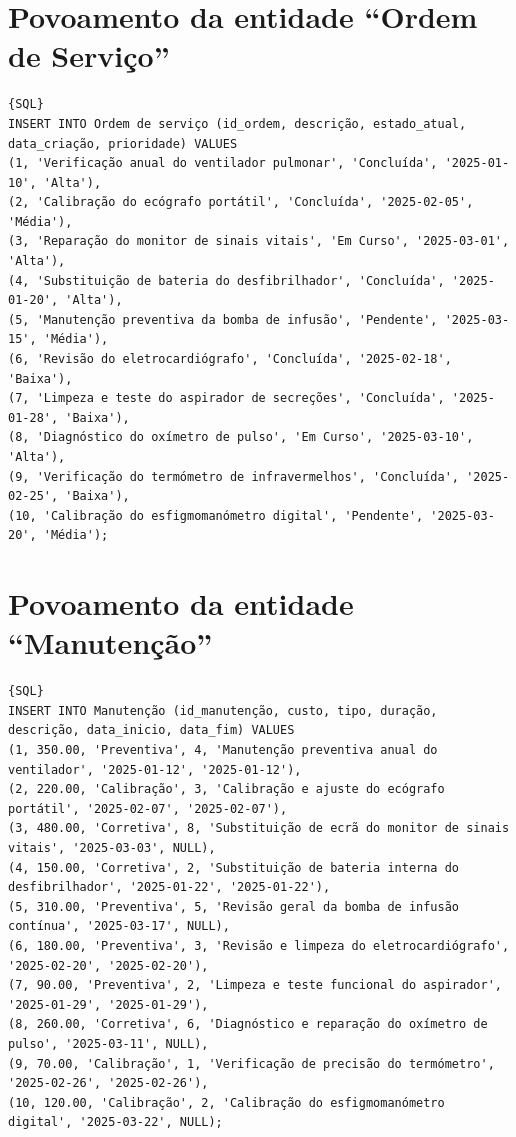 \section{Povoamento da entidade “Ordem de Serviço”}
{\small
\begin{lstlisting}[breaklines]{SQL}
INSERT INTO Ordem de serviço (id_ordem, descrição, estado_atual, data_criação, prioridade) VALUES
(1, 'Verificação anual do ventilador pulmonar', 'Concluída', '2025-01-10', 'Alta'),
(2, 'Calibração do ecógrafo portátil', 'Concluída', '2025-02-05', 'Média'),
(3, 'Reparação do monitor de sinais vitais', 'Em Curso', '2025-03-01', 'Alta'),
(4, 'Substituição de bateria do desfibrilhador', 'Concluída', '2025-01-20', 'Alta'),
(5, 'Manutenção preventiva da bomba de infusão', 'Pendente', '2025-03-15', 'Média'),
(6, 'Revisão do eletrocardiógrafo', 'Concluída', '2025-02-18', 'Baixa'),
(7, 'Limpeza e teste do aspirador de secreções', 'Concluída', '2025-01-28', 'Baixa'),
(8, 'Diagnóstico do oxímetro de pulso', 'Em Curso', '2025-03-10', 'Alta'),
(9, 'Verificação do termómetro de infravermelhos', 'Concluída', '2025-02-25', 'Baixa'),
(10, 'Calibração do esfigmomanómetro digital', 'Pendente', '2025-03-20', 'Média');
\end{lstlisting}
}

\section{Povoamento da entidade “Manutenção”}
{\small
\begin{lstlisting}[breaklines]{SQL}
INSERT INTO Manutenção (id_manutenção, custo, tipo, duração, descrição, data_inicio, data_fim) VALUES
(1, 350.00, 'Preventiva', 4, 'Manutenção preventiva anual do ventilador', '2025-01-12', '2025-01-12'),
(2, 220.00, 'Calibração', 3, 'Calibração e ajuste do ecógrafo portátil', '2025-02-07', '2025-02-07'),
(3, 480.00, 'Corretiva', 8, 'Substituição de ecrã do monitor de sinais vitais', '2025-03-03', NULL),
(4, 150.00, 'Corretiva', 2, 'Substituição de bateria interna do desfibrilhador', '2025-01-22', '2025-01-22'),
(5, 310.00, 'Preventiva', 5, 'Revisão geral da bomba de infusão contínua', '2025-03-17', NULL),
(6, 180.00, 'Preventiva', 3, 'Revisão e limpeza do eletrocardiógrafo', '2025-02-20', '2025-02-20'),
(7, 90.00, 'Preventiva', 2, 'Limpeza e teste funcional do aspirador', '2025-01-29', '2025-01-29'),
(8, 260.00, 'Corretiva', 6, 'Diagnóstico e reparação do oxímetro de pulso', '2025-03-11', NULL),
(9, 70.00, 'Calibração', 1, 'Verificação de precisão do termómetro', '2025-02-26', '2025-02-26'),
(10, 120.00, 'Calibração', 2, 'Calibração do esfigmomanómetro digital', '2025-03-22', NULL);
\end{lstlisting}
}

